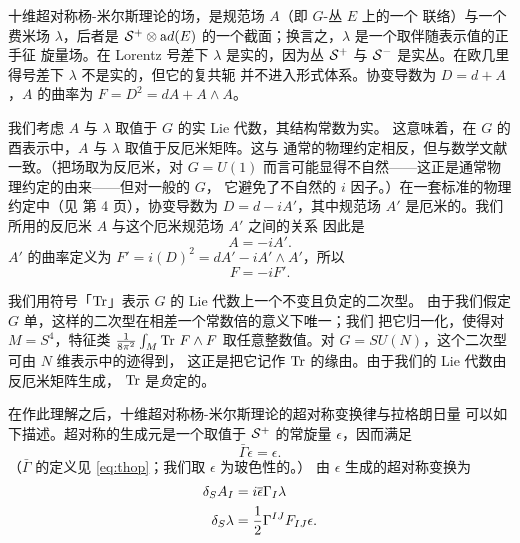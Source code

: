 \par{}

 十维超对称杨-米尔斯理论的场，是规范场 $A$（即 $G$-丛 $E$ 上的一个
联络）与一个费米场 $\lambda$，后者是 ${\EUS}^+\otimes {\rm
ad}(E)$ 的一个截面；换言之，$\lambda$ 是一个取伴随表示值的正手征
旋量场。在 Lorentz 号差下 $\lambda$ 是实的，因为丛 ${\EUS}^+$ 与
${\EUS}^-$ 是实丛。在欧几里得号差下 $\lambda$ 不是实的，但它的复共轭
并不进入形式体系。协变导数为 $D=d+A$，$A$ 的曲率为
$F=D^2=dA+A\wedge A$。

 我们考虑 $A$ 与 $\lambda$ 取值于 $G$ 的实 Lie 代数，其结构常数为实。
这意味着，在 $G$ 的酉表示中，$A$ 与 $\lambda$ 取值于反厄米矩阵。这与
通常的物理约定相反，但与数学文献一致。（把场取为反厄米，对 $G=U(1)$
而言可能显得不自然——这正是通常物理约定的由来——但对一般的 $G$，
它避免了不自然的 $i$ 因子。）在一套标准的物理约定中（见 \cite{ref44} 第 4 页），协变导数为 $D=d-iA'$，其中规范场
$A'$ 是厄米的。我们所用的反厄米 $A$ 与这个厄米规范场 $A'$ 之间的关系
因此是
\setcounter{equation}{1}
\begin{equation}\label{eq:boloko}
A=-iA'.
\end{equation}
  $A'$ 的曲率定义为
$F'=i(D)^2=dA'-i A'\wedge A'$，所以 %
\setcounter{equation}{2}
\begin{equation}\label{eq:obolko}
F=-iF'.
\end{equation}

 我们用符号「$\Tr$」表示 $G$ 的 Lie 代数上一个不变且负定的二次型。
由于我们假定 $G$ 单，这样的二次型在相差一个常数倍的意义下唯一；我们
把它归一化，使得对 $M=S^4$，特征类 ${1\over 8\pi^2}\int_M\Tr\, F\wedge F$
取任意整数值。对 $G=SU(N)$，这个二次型可由 $N$ 维表示中的迹得到，
这正是把它记作 $\Tr$ 的缘由。由于我们的 Lie 代数由反厄米矩阵生成，
$\Tr$ 是{\it 负}定的。

 在作此理解之后，十维超对称杨-米尔斯理论的超对称变换律与拉格朗日量
可以如下描述。超对称的生成元是一个取值于 ${\EUS}^+$ 的常旋量
$\epsilon$，因而满足 %
\setcounter{equation}{3}
\begin{equation}\label{eq:goggo}
\bar\Gamma\epsilon=\epsilon.
\end{equation}
（$\bar
\Gamma$ 的定义见 \eqref{eq:thop}；我们取 $\epsilon$ 为玻色性的。）
由 $\epsilon$ 生成的超对称变换为
\setcounter{equation}{4}
\begin{equation}\label{eq:hygo}
\begin{aligned}\delta_S A_I & = i\bar\epsilon\Gamma_I\lambda
\\
                   \delta_S\lambda & = {1\over 2}
                   \Gamma^{IJ}F_{IJ}\epsilon.\\\end{aligned}
\end{equation}

